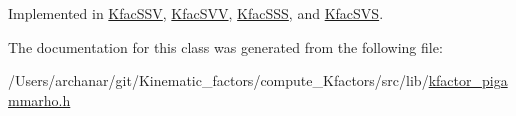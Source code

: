 Implemented in \mbox{\hyperlink{classKfacSSV_aeea4f3f068452d233d4111d72c05cd4f}{Kfac\+S\+SV}}, \mbox{\hyperlink{classKfacSVV_acb7f7f6bf0957694a73271704bb0569f}{Kfac\+S\+VV}}, \mbox{\hyperlink{classKfacSSS_a25ca7daf4005bf951ad67d568e3f3936}{Kfac\+S\+SS}}, and \mbox{\hyperlink{classKfacSVS_a1bcfae29380c602c7040ad790ccff63f}{Kfac\+S\+VS}}.



The documentation for this class was generated from the following file\+:\begin{DoxyCompactItemize}
\item 
/\+Users/archanar/git/\+Kinematic\+\_\+factors/compute\+\_\+\+Kfactors/src/lib/\mbox{\hyperlink{kfactor__pigammarho_8h}{kfactor\+\_\+pigammarho.\+h}}\end{DoxyCompactItemize}
